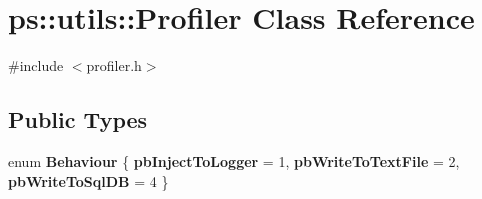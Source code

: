 \hypertarget{classps_1_1utils_1_1Profiler}{}\section{ps\+:\+:utils\+:\+:Profiler Class Reference}
\label{classps_1_1utils_1_1Profiler}


{\ttfamily \#include $<$profiler.\+h$>$}

\subsection*{Public Types}
\begin{DoxyCompactItemize}
\item 
\hypertarget{classps_1_1utils_1_1Profiler_afd5414284f6626a463dab0ec2a3b2840}{}enum {\bfseries Behaviour} \{ {\bfseries pb\+Inject\+To\+Logger} = 1, 
{\bfseries pb\+Write\+To\+Text\+File} = 2, 
{\bfseries pb\+Write\+To\+Sql\+D\+B} = 4
 \}\label{classps_1_1utils_1_1Profiler_afd5414284f6626a463dab0ec2a3b2840}

\end{DoxyCompactItemize}
